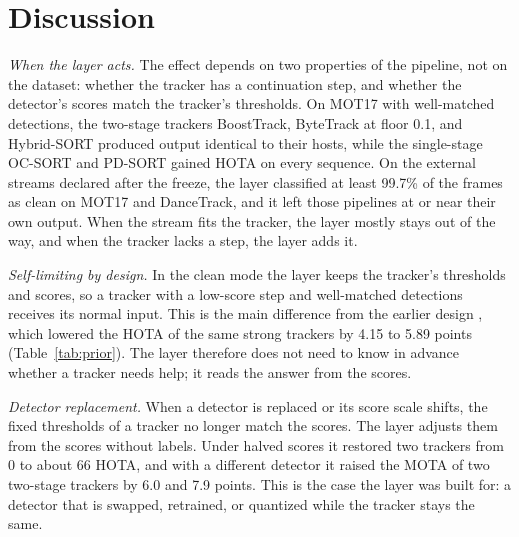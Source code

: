 \section{Discussion}\label{sec:discussion}

\emph{When the layer acts.} The effect depends on two properties of the
pipeline, not on the dataset: whether the tracker has a continuation step,
and whether the detector's scores match the tracker's thresholds. On MOT17
with well-matched detections, the two-stage trackers BoostTrack, ByteTrack at
floor 0.1, and Hybrid-SORT produced output identical to their hosts, while
the single-stage OC-SORT and PD-SORT gained HOTA on every sequence. On the
external streams declared after the freeze, the layer classified at least
99.7\% of the frames as clean on MOT17 and DanceTrack, and it left those
pipelines at or near their own output. When the stream fits the tracker, the
layer mostly stays out of the way, and when the tracker lacks a step, the
layer adds it.

\emph{Self-limiting by design.} In the clean mode the layer keeps the
tracker's thresholds and scores, so a tracker with a low-score step and
well-matched detections receives its normal input. This is the main
difference from the earlier design \aob{}, which lowered the HOTA of the same
strong trackers by 4.15 to 5.89 points (Table~\ref{tab:prior}). The layer
therefore does not need to know in advance whether a tracker needs help; it
reads the answer from the scores.

\emph{Detector replacement.} When a detector is replaced or its score scale
shifts, the fixed thresholds of a tracker no longer match the scores. The
layer adjusts them from the scores without labels. Under halved scores it
restored two trackers from 0 to about 66 HOTA, and with a different detector
it raised the MOTA of two two-stage trackers by 6.0 and 7.9 points. This is
the case the layer was built for: a detector that is swapped, retrained, or
quantized while the tracker stays the same.

